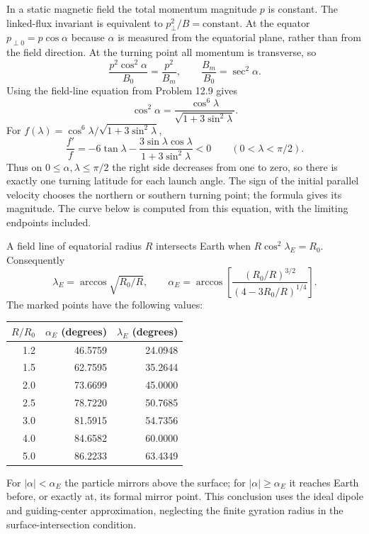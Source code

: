 In a static magnetic field the total momentum magnitude $p$ is
constant.  The linked-flux invariant is equivalent to
$p_\perp^2/B=\mathrm{constant}$.  At the equator
$p_{\perp0}=p\cos\alpha$ because $\alpha$ is measured from the
equatorial plane, rather than from the field direction.
At the turning point all momentum is transverse, so
\[
\frac{p^2\cos^2\alpha}{B_0}=\frac{p^2}{B_m},\qquad
\frac{B_m}{B_0}=\sec^2\alpha.
\]
Using the field-line equation from Problem 12.9 gives
\[
\boxed{\cos^2\alpha=
 \frac{\cos^6\lambda}{\sqrt{1+3\sin^2\lambda}}.}
\]
For $f(\lambda)=\cos^6\lambda/\sqrt{1+3\sin^2\lambda}$,
\[
\frac{f'}f=-6\tan\lambda
-\frac{3\sin\lambda\cos\lambda}{1+3\sin^2\lambda}<0
\qquad(0<\lambda<\pi/2).
\]
Thus on $0\leq\alpha,\lambda\leq\pi/2$ the right side decreases
from one to zero, so there is exactly one turning
latitude for each launch angle.  The sign of the initial parallel
velocity chooses the northern or southern turning point; the
formula gives its magnitude.  The curve below is computed from
this equation, with the limiting endpoints included.
\begin{center}\end{center}
A field line of equatorial radius $R$ intersects Earth when
$R\cos^2\lambda_E=R_0$.  Consequently
\[
\boxed{\lambda_E=\arccos\sqrt{R_0/R},\qquad
\alpha_E=\arccos\left[
 \frac{(R_0/R)^{3/2}}{(4-3R_0/R)^{1/4}}\right].}
\]
The marked points have the following values:
\begin{center}
\begin{tabular}{rrr}
\toprule
$R/R_0$&$\alpha_E$ (degrees)&$\lambda_E$ (degrees)\\
\midrule
1.2&46.5759&24.0948\\
1.5&62.7595&35.2644\\
2.0&73.6699&45.0000\\
2.5&78.7220&50.7685\\
3.0&81.5915&54.7356\\
4.0&84.6582&60.0000\\
5.0&86.2233&63.4349\\
\bottomrule
\end{tabular}
\end{center}
For $|\alpha|<\alpha_E$ the particle mirrors above the surface;
for $|\alpha|\geq\alpha_E$ it reaches Earth before, or exactly
at, its formal mirror point.  This conclusion uses the ideal dipole
and guiding-center approximation, neglecting the finite gyration
radius in the surface-intersection condition.

